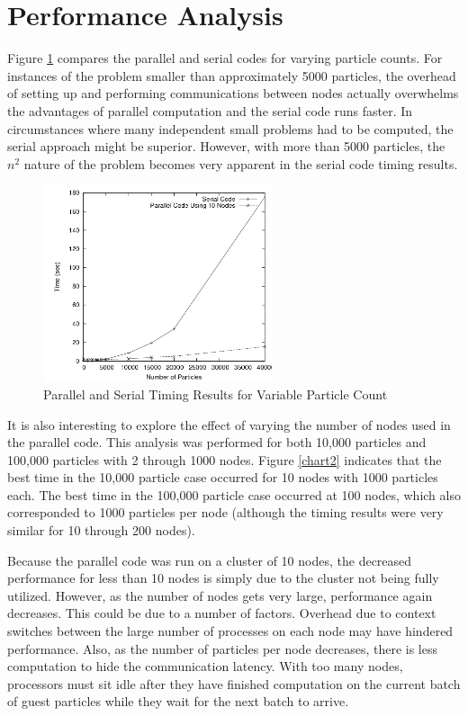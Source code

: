\documentclass{article}
\begin{document}
\section{Performance Analysis}
Figure \ref{chart1} compares the parallel and serial codes for varying particle counts. For instances of the problem smaller than approximately 5000 particles, the overhead of setting up and performing communications between nodes actually overwhelms the advantages of parallel computation and the serial code runs faster. In circumstances where many independent small problems had to be computed, the serial approach might be superior. However, with more than 5000 particles, the \(n^2\) nature of the problem becomes very apparent in the serial code timing results.

\begin{figure}
\centering
\includegraphics[width=0.6\textwidth]{img/timing_data_variable_particles.png}
\caption{Parallel and Serial Timing Results for Variable Particle Count}
\label{chart1}
\end{figure}

It is also interesting to explore the effect of varying the number of nodes used in the parallel code. This analysis was performed for both 10,000 particles and 100,000 particles with 2 through 1000 nodes. Figure \ref{chart2} indicates that the best time in the 10,000 particle case occurred for 10 nodes with 1000 particles each. The best time in the 100,000 particle case occurred at 100 nodes, which also corresponded to 1000 particles per node (although the timing results were very similar for 10 through 200 nodes).

Because the parallel code was run on a cluster of 10 nodes, the decreased performance for less than 10 nodes is simply due to the cluster not being fully utilized. However, as the number of nodes gets very large, performance again decreases. This could be due to a number of factors. Overhead due to context switches between the large number of processes on each node may have hindered performance. Also, as the number of particles per node decreases, there is less computation to hide the communication latency. With too many nodes, processors must sit idle after they have finished computation on the current batch of guest particles while they wait for the next batch to arrive.
\end{document}
